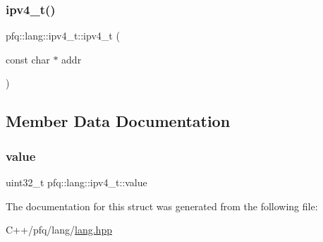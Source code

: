 \mbox{\label{structpfq_1_1lang_1_1ipv4__t_a86fa55f6ef31157415d65d43ce228fae}} 
\subsubsection{\texorpdfstring{ipv4\+\_\+t()}{ipv4\_t()}\hspace{0.1cm}{\footnotesize\ttfamily [2/2]}}
{\footnotesize\ttfamily pfq\+::lang\+::ipv4\+\_\+t\+::ipv4\+\_\+t (\begin{DoxyParamCaption}\item[{const char $\ast$}]{addr }\end{DoxyParamCaption})\hspace{0.3cm}{\ttfamily [inline]}}



\subsection{Member Data Documentation}
\mbox{\label{structpfq_1_1lang_1_1ipv4__t_a5080d5f65781ad95e605d066f1693502}} 
\subsubsection{\texorpdfstring{value}{value}}
{\footnotesize\ttfamily uint32\+\_\+t pfq\+::lang\+::ipv4\+\_\+t\+::value}



The documentation for this struct was generated from the following file\+:\begin{DoxyCompactItemize}
\item 
C++/pfq/lang/\hyperlink{lang_8hpp}{lang.\+hpp}\end{DoxyCompactItemize}
